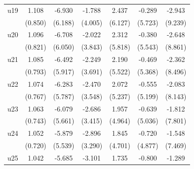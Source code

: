 \begin{table}[htbp]
\begin{tabular}{l*{6}{c}}
\addlinespace
u19                 &       1.108         &      -6.930         &      -1.788         &       2.437         &      -0.289         &      -2.943         \\
                    &     (0.850)         &     (6.188)         &     (4.005)         &     (6.127)         &     (5.723)         &     (9.239)         \\
\addlinespace
u20                 &       1.096         &      -6.708         &      -2.022         &       2.312         &      -0.380         &      -2.648         \\
                    &     (0.821)         &     (6.050)         &     (3.843)         &     (5.818)         &     (5.543)         &     (8.861)         \\
\addlinespace
u21                 &       1.085         &      -6.492         &      -2.249         &       2.190         &      -0.469         &      -2.362         \\
                    &     (0.793)         &     (5.917)         &     (3.691)         &     (5.522)         &     (5.368)         &     (8.496)         \\
\addlinespace
u22                 &       1.074         &      -6.283         &      -2.470         &       2.072         &      -0.555         &      -2.083         \\
                    &     (0.767)         &     (5.787)         &     (3.548)         &     (5.237)         &     (5.199)         &     (8.143)         \\
\addlinespace
u23                 &       1.063         &      -6.079         &      -2.686         &       1.957         &      -0.639         &      -1.812         \\
                    &     (0.743)         &     (5.661)         &     (3.415)         &     (4.964)         &     (5.036)         &     (7.801)         \\
\addlinespace
u24                 &       1.052         &      -5.879         &      -2.896         &       1.845         &      -0.720         &      -1.548         \\
                    &     (0.720)         &     (5.539)         &     (3.290)         &     (4.701)         &     (4.877)         &     (7.469)         \\
\addlinespace
u25                 &       1.042         &      -5.685         &      -3.101         &       1.735         &      -0.800         &      -1.289         \\

\end{tabular}
\end{table}
